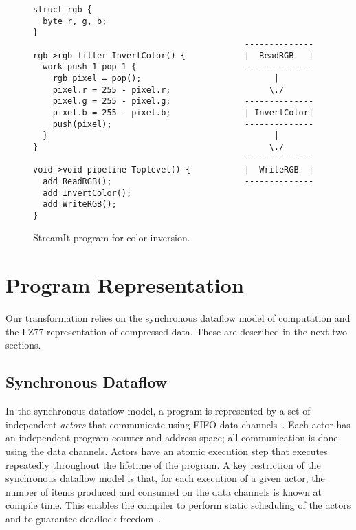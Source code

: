 \begin{figure}[t]
\scriptsize
\begin{verbatim}
struct rgb {
  byte r, g, b;
}
                                           --------------
rgb->rgb filter InvertColor() {            |  ReadRGB   |
  work push 1 pop 1 {                      --------------
    rgb pixel = pop();                           |
    pixel.r = 255 - pixel.r;                    \./
    pixel.g = 255 - pixel.g;               --------------
    pixel.b = 255 - pixel.b;               | InvertColor|
    push(pixel);                           --------------
  }                                              |
}                                               \./
                                           --------------
void->void pipeline Toplevel() {           |  WriteRGB  |
  add ReadRGB();                           --------------
  add InvertColor();
  add WriteRGB();
}
\end{verbatim}
\caption{StreamIt program for color inversion.
\protect\label{fig:streamit}}
\end{figure}

\section{Program Representation}

Our transformation relies on the synchronous dataflow model of
computation and the LZ77 representation of compressed data.  These are
described in the next two sections.

\subsection{Synchronous Dataflow}

In the synchronous dataflow model, a program is represented by a set
of independent {\it actors} that communicate using FIFO data
channels~\cite{LM87-i}.  Each actor has an independent program counter
and address space; all communication is done using the data channels.
Actors have an atomic execution step that executes repeatedly
throughout the lifetime of the program.  A key restriction of the
synchronous dataflow model is that, for each execution of a given
actor, the number of items produced and consumed on the data channels
is known at compile time.  This enables the compiler to perform static
scheduling of the actors and to guarantee deadlock freedom~\cite{LM87-i}.

